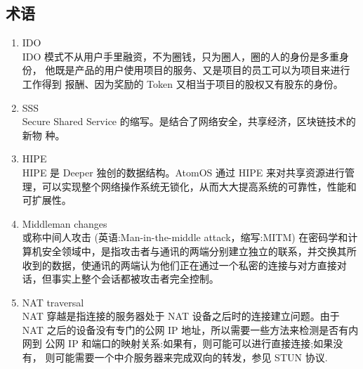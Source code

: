 \documentclass[a4paper]{article}
\begin{document}
\newpage
\begin{appendices}
\section{术语}

\begin{enumerate}[label={\Alph*.}]
\item IDO \\
IDO 模式不从用户手里融资，不为圈钱，只为圈人，圈的人的身份是多重身份， 他既是产品的用户使用项目的服务、又是项目的员工可以为项目来进行工作得到 报酬、因为奖励的 Token 又相当于项目的股权又有股东的身份。

\item SSS \\
Secure Shared Service 的缩写。是结合了网络安全，共享经济，区块链技术的新物 种。

\item HIPE \\
HIPE 是 Deeper 独创的数据结构。AtomOS 通过 HIPE 来对共享资源进行管理，可以实现整个网络操作系统无锁化，从而大大提高系统的可靠性，性能和可扩展性。

\item Middleman changes \\
或称中间人攻击 (英语:Man-in-the-middle attack，缩写:MITM) 在密码学和计 算机安全领域中，是指攻击者与通讯的两端分别建立独立的联系，并交换其所 收到的数据，使通讯的两端认为他们正在通过一个私密的连接与对方直接对 话，但事实上整个会话都被攻击者完全控制。

\item NAT traversal \\
NAT 穿越是指连接的服务器处于 NAT 设备之后时的连接建立问题。由于 NAT 之后的设备没有专门的公网 IP 地址，所以需要一些方法来检测是否有内网到 公网 IP 和端口的映射关系:如果有，则可能可以进行直接连接;如果没有， 则可能需要一个中介服务器来完成双向的转发，参见 STUN 协议\cite{rosenbergstun}.
\end{enumerate}

\newpage

\end{appendices}
\end{document}
